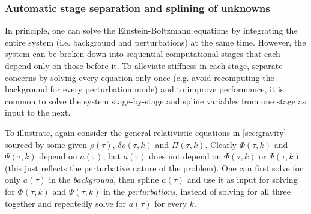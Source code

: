 \documentclass{aa}
\newcommand\scrH{\mathscr{H}}
\begin{document}
\subsubsection{Automatic stage separation and splining of unknowns}
\label{sec:splining}

In principle, one can solve the Einstein-Boltzmann equations by integrating the entire system (i.e. background and perturbations) at the same time.
However, the system can be broken down into sequential computational stages that each depend only on those before it.
To alleviate stiffness in each stage, separate concerns by solving every equation only once (e.g. avoid recomputing the background for every perturbation mode) and to improve performance, it is common to solve the system stage-by-stage and spline variables from one stage as input to the next.

To illustrate, again consider the general relativistic equations in \cref{sec:gravity} sourced by some given $\rho(\tau)$, $\delta\rho(\tau,k)$ and $\Pi(\tau,k)$.
\iffalse%
\begin{subequations}
\begin{align}
    a^\prime(\tau) &\!=\! \sqrt{8 \pi \rho(\tau) a(\tau)^4 \,/\, 3}, \\
    \scrH(\tau) &\!=\! a^\prime(\tau) \,/\, a(\tau), \\
    \Phi^\prime(\tau,k) &\!=\! -\frac{k^{2} \Phi(\tau,k)}{3 \scrH(\tau)} \!-\! \frac{4\pi a(\tau)^2 \delta\rho(\tau,k)}{3 \scrH(\tau)} \!-\! \scrH(\tau) \Psi(\tau,k), \\
    \Psi(\tau,k) &\!=\! \Phi(\tau,k) \!-\! \frac{12 \pi a(\tau)^{2} \Pi(\tau,k)}{k^2},
\label{eq:gr}
\end{align}
\end{subequations}
coupled to some total $\rho(\tau)$, $\delta\rho(\tau,k)$ and $\Pi(\tau,k)$ from some particle species.
\fi%
Clearly $\Phi(\tau,k)$ and $\Psi(\tau,k)$ depend on $a(\tau)$, but $a(\tau)$ does not depend on $\Phi(\tau,k)$ or $\Psi(\tau,k)$ (this just reflects the perturbative nature of the problem).
One can first solve for only $a(\tau)$ in the \textit{background}, then spline $a(\tau)$ and use it as input for solving for $\Phi(\tau,k)$ and $\Psi(\tau,k)$ in the \textit{perturbations}, instead of solving for all three together and repeatedly solve for $a(\tau)$ for every $k$.
\end{document}
